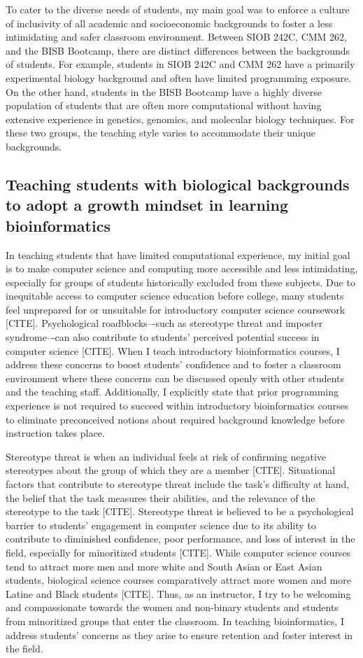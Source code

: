 To cater to the diverse needs of students, my main goal was to enforce a culture of inclusivity of all academic and socioeconomic backgrounds to foster a less intimidating and safer classroom environment. Between SIOB 242C, CMM 262, and the BISB Bootcamp, there are distinct differences between the backgrounds of students. For example, students in SIOB 242C and CMM 262 have a primarily experimental biology background and often have limited programming exposure. On the other hand, students in the BISB Bootcamp have a highly diverse population of students that are often more computational without having extensive experience in genetics, genomics, and molecular biology techniques. For these two groups, the teaching style varies to accommodate their unique backgrounds. 

\subsection{Teaching students with biological backgrounds to adopt a growth mindset in learning bioinformatics}

In teaching students that have limited computational experience, my initial goal is to make computer science and computing more accessible and less intimidating, especially for groups of students historically excluded from these subjects. Due to inequitable access to computer science education before college, many students feel unprepared for or unsuitable for introductory computer science coursework [CITE]. Psychological roadblocks–-such as stereotype threat and imposter syndrome–-can also contribute to students’ perceived potential success in computer science [CITE]. When I teach introductory bioinformatics courses, I address these concerns to boost students’ confidence and to foster a classroom environment where these concerns can be discussed openly with other students and the teaching staff. Additionally, I explicitly state that prior programming experience is not required to succeed within introductory bioinformatics courses to eliminate preconceived notions about required background knowledge before instruction takes place.

Stereotype threat is when an individual feels at risk of confirming negative stereotypes about the group of which they are a member [CITE]. Situational factors that contribute to stereotype threat include the task’s difficulty at hand, the belief that the task measures their abilities, and the relevance of the stereotype to the task [CITE]. Stereotype threat is believed to be a psychological barrier to students’ engagement in computer science due to its ability to contribute to diminished confidence, poor performance, and loss of interest in the field, especially for minoritized students [CITE]. While computer science courses tend to attract more men and more white and South Asian or East Asian students, biological science courses comparatively attract more women and more Latine and Black students [CITE]. Thus, as an instructor, I try to be welcoming and compassionate towards the women and non-binary students and students from minoritized groups that enter the classroom. In teaching bioinformatics, I address students’ concerns as they arise to ensure retention and foster interest in the field.

